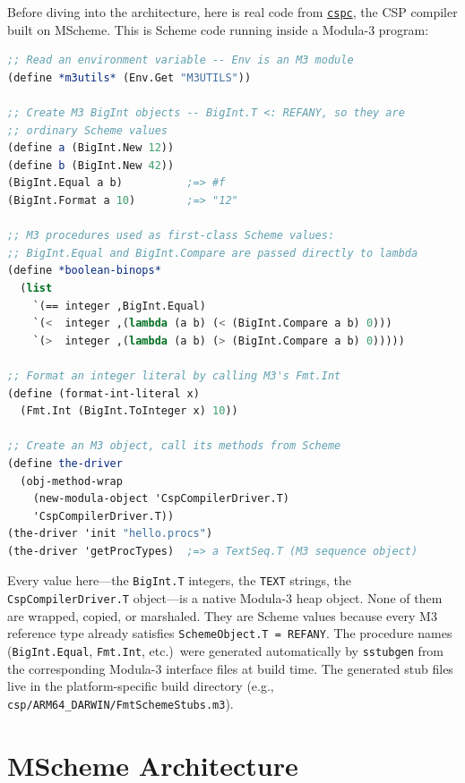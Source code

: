 \documentclass[11pt]{article}
\begin{document}
Before diving into the architecture, here is real code from
\href{https://github.com/IntelLabs/async-toolkit/tree/main/m3utils/m3utils/csp}{\texttt{cspc}},
the CSP compiler built on MScheme.  This is Scheme code running
inside a Modula-3 program:

\begin{lstlisting}[language=Scheme]
;; Read an environment variable -- Env is an M3 module
(define *m3utils* (Env.Get "M3UTILS"))

;; Create M3 BigInt objects -- BigInt.T <: REFANY, so they are
;; ordinary Scheme values
(define a (BigInt.New 12))
(define b (BigInt.New 42))
(BigInt.Equal a b)          ;=> #f
(BigInt.Format a 10)        ;=> "12"

;; M3 procedures used as first-class Scheme values:
;; BigInt.Equal and BigInt.Compare are passed directly to lambda
(define *boolean-binops*
  (list
    `(== integer ,BigInt.Equal)
    `(<  integer ,(lambda (a b) (< (BigInt.Compare a b) 0)))
    `(>  integer ,(lambda (a b) (> (BigInt.Compare a b) 0)))))

;; Format an integer literal by calling M3's Fmt.Int
(define (format-int-literal x)
  (Fmt.Int (BigInt.ToInteger x) 10))

;; Create an M3 object, call its methods from Scheme
(define the-driver
  (obj-method-wrap
    (new-modula-object 'CspCompilerDriver.T)
    'CspCompilerDriver.T))
(the-driver 'init "hello.procs")
(the-driver 'getProcTypes)  ;=> a TextSeq.T (M3 sequence object)
\end{lstlisting}

Every value here---the \texttt{BigInt.T} integers, the \texttt{TEXT}
strings, the \texttt{CspCompilerDriver.T} object---is a native
Modula-3 heap object.  None of them are wrapped, copied, or
marshaled.  They are Scheme values because every M3 reference type
already satisfies \texttt{SchemeObject.T = REFANY}.  The procedure
names (\texttt{BigInt.Equal}, \texttt{Fmt.Int}, etc.)\ were generated
automatically by \texttt{sstubgen} from the corresponding Modula-3
interface files at build time.  The generated stub files live in the
platform-specific build directory (e.g.,
\texttt{csp/ARM64\_DARWIN/FmtSchemeStubs.m3}).


\section{MScheme Architecture}
\label{sec:architecture}
\end{document}

